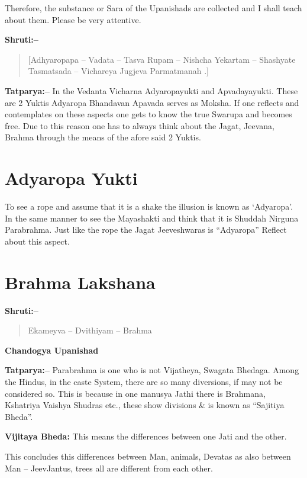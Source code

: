 Therefore, the substance or Sara of the Upanishads are collected and I shall teach about them. Please be very attentive.

\textbf{Shruti:–}

\begin{verse}
[Adhyaropapa – Vadata – Tasva Rupam – Nishcha Yekartam – Shashyate  Tasmatsada – Vichareya Jugjeva Parmatmanah .]
\end{verse}

\textbf{Tatparya:–} In the Vedanta Vicharna Adyaropayukti and Apvadayayukti. These are 2 Yuktis Adyaropa Bhandavan Apavada serves as Moksha. If one reflects and contemplates on these aspects one gets to know the true Swarupa and becomes free. Due to this reason one has to always think about the Jagat, Jeevana, Brahma through the means of the afore said 2 Yuktis.

\chapter{Adyaropa Yukti}

To see a rope and assume that it is a shake the illusion is known as ‘Adyaropa’. In the same manner to see the Mayashakti and think that it is Shuddah Nirguna Parabrahma. Just like the rope the Jagat Jeeveshwaras is “Adyaropa” Reflect about this aspect.

\chapter{Brahma Lakshana}

\textbf{Shruti:–}

\begin{verse}
Ekameyva – Dvithiyam – Brahma
\end{verse}

\begin{flushright}
\textbf{Chandogya Upanishad}
\end{flushright}

\textbf{Tatparya:–} Parabrahma is one who is not Vijatheya, Swagata Bhedaga. Among the Hindus, in the caste System, there are so many diversions, if may not be considered so. This is because in one manusya Jathi there is Brahmana, Kshatriya Vaishya Shudras etc., these show divisions \& is known as “Sajitiya Bheda”.

\textbf{Vijitaya Bheda:} This means the differences between one Jati and the other.

This concludes this differences between Man, animals, Devatas as also between Man – JeevJantus, trees all are different from each other.

